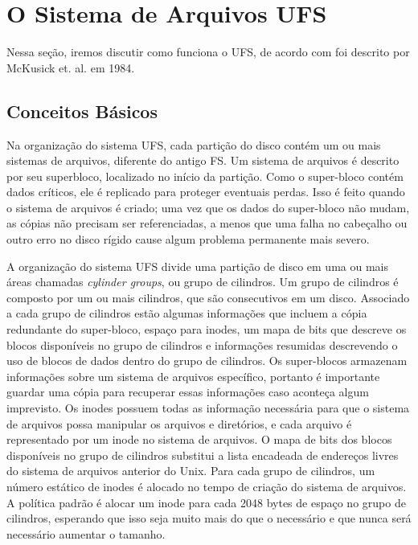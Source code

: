 \section{O Sistema de Arquivos UFS}

Nessa seção, iremos discutir como funciona o UFS, de acordo com foi descrito por McKusick et. al. \cite{mckusick1984fast} em 1984.

\subsection{Conceitos Básicos}

Na organização do sistema UFS, cada partição do disco contém um ou mais sistemas de arquivos, diferente do antigo FS. Um sistema de arquivos é descrito por seu superbloco, localizado no início da partição. Como o super-bloco contém dados críticos, ele é replicado para proteger eventuais perdas. Isso é feito quando o sistema de arquivos é criado; uma vez que os dados do super-bloco não mudam, as cópias não precisam ser referenciadas, a menos que uma falha no cabeçalho ou outro erro no disco rígido cause algum problema permanente mais severo.

A organização do sistema UFS divide uma partição de disco em uma ou mais áreas chamadas \textit{cylinder groups}, ou grupo de cilindros. Um grupo de cilindros é composto por um ou mais cilindros, que são consecutivos em um disco. Associado a cada grupo de cilindros estão algumas informações que incluem a cópia redundante do super-bloco, espaço para inodes, um mapa de bits que descreve os blocos disponíveis no grupo de cilindros e informações resumidas descrevendo o uso de blocos de dados dentro do grupo de cilindros. Os super-blocos armazenam informações sobre um sistema de arquivos específico, portanto é importante guardar uma cópia para recuperar essas informações caso aconteça algum imprevisto. Os inodes possuem todas as informação necessária para que o sistema de arquivos possa manipular os arquivos e diretórios, e cada arquivo é representado por um inode no sistema de arquivos. O mapa de bits dos blocos disponíveis no grupo de cilindros substitui a lista encadeada de endereços livres do sistema de arquivos anterior do Unix. Para cada grupo de cilindros, um número estático de inodes é alocado no tempo de criação do sistema de arquivos. A política padrão é alocar um inode para cada 2048 bytes de espaço no grupo de cilindros, esperando que isso seja muito mais do que o necessário e que nunca será necessário aumentar o tamanho.

